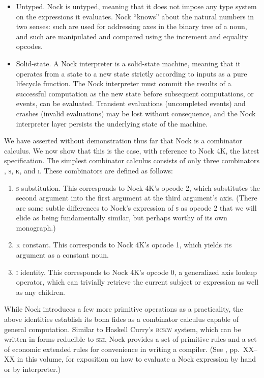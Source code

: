\documentclass[twoside]{article}
\begin{document}
\begin{itemize}
  \item  Untyped.  Nock is untyped, meaning that it does not impose any type system on the expressions it evaluates.  Nock ``knows'' about the natural numbers in two senses:  such are used for addressing axes in the binary tree of a noun, and such are manipulated and compared using the increment and equality opcodes.

  \item  Solid-state.  A Nock interpreter is a solid-state machine, meaning that it operates from a state to a new state strictly according to inputs as a pure lifecycle function.  The Nock interpreter must commit the results of a successful computation as the new state before subsequent computations, or events, can be evaluated.  Transient evaluations (uncompleted events) and crashes (invalid evaluations) may be lost without consequence, and the Nock interpreter layer persists the underlying state of the machine.
\end{itemize}

We have asserted without demonstration thus far that Nock is a combinator calculus.  We now show that this is the case, with reference to Nock 4K, the latest specification.  The simplest combinator calculus consists of only three combinators \citep{SomeoneSmart}, \textsc{s}, \textsc{k}, and \textsc{i}.  These combinators are defined as follows:

\begin{enumerate}
  \item  \textsc{s} substitution.  This corresponds to Nock 4K's opcode 2, which substitutes the second argument into the first argument at the third argument's axis.  (There are some subtle differences to Nock's expression of \textsc{s} as opcode 2 that we will elide as being fundamentally similar, but perhaps worthy of its own monograph.)
  \item  \textsc{k} constant.  This corresponds to Nock 4K's opcode 1, which yields its argument as a constant noun.
  \item  \textsc{i} identity.  This corresponds to Nock 4K's opcode 0, a generalized axis lookup operator, which can trivially retrieve the current subject or expression as well as any children.
\end{enumerate}

\noindent
While Nock introduces a few more primitive operations as a practicality, the above identities establish its bona fides as a combinator calculus capable of general computation.  Similar to Haskell Curry's \textsc{bckw} system, which can be written in forms reducible to \textsc{ski}, Nock provides a set of primitive rules and a set of economic extended rules for convenience in writing a compiler.  (See \citet{Galebach2025}, pp.~XX–XX in this volume, for exposition on how to evaluate a Nock expression by hand or by interpreter.)
\end{document}
